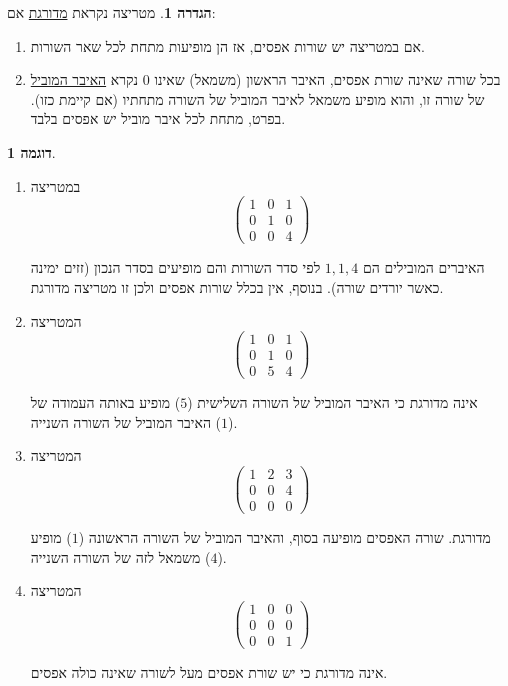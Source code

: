 \documentclass[12pt]{report}
\theoremstyle{plain}
\theoremstyle{definition}
\newtheorem{definition}[theorem]{הגדרה}
\newtheorem{example}{דוגמה}[chapter]
\newcommand{\0}{\mathbf{0}}
\begin{document}
\begin{definition}
מטריצה נקראת
\underline{מדורגת}
אם:

\begin{enumerate}[label=\alph*.]
\item
אם במטריצה יש שורות אפסים, אז הן מופיעות מתחת לכל
שאר השורות.

\item
בכל שורה שאינה שורת אפסים, האיבר הראשון (משמאל) שאינו $0$ נקרא
\underline{האיבר המוביל}
של שורה זו, והוא מופיע משמאל לאיבר המוביל של השורה מתחתיו (אם קיימת כזו). בפרט, מתחת לכל איבר מוביל יש אפסים בלבד.
\end{enumerate}
\end{definition}

\begin{example}\
\begin{enumerate}[label=\alph*.]
\item
במטריצה 
$$
\begin{pmatrix}1 & 0 & 1\\
0 & 1 & 0\\
0 & 0 & 4
\end{pmatrix}
$$

האיברים המובילים הם $1,1,4$ לפי סדר השורות והם מופיעים בסדר הנכון (זזים ימינה כאשר יורדים שורה). בנוסף, אין בכלל שורות אפסים ולכן זו
מטריצה מדורגת.

\item
המטריצה
$$
\begin{pmatrix}1 & 0 & 1\\
0 & 1 & 0\\
0 & 5 & 4
\end{pmatrix}
$$

אינה מדורגת כי האיבר המוביל של השורה השלישית ($5$) מופיע באותה
העמודה של האיבר המוביל של השורה השנייה ($1$).

\item
המטריצה 
$$
\begin{pmatrix}1 & 2 & 3\\
0 & 0 & 4\\
0 & 0 & 0
\end{pmatrix}
$$

מדורגת. שורה האפסים מופיעה בסוף, והאיבר המוביל של השורה הראשונה
($1$)
מופיע משמאל לזה של השורה השנייה
($4$).

\item
המטריצה 
$$
\begin{pmatrix}1 & 0 & 0\\
0 & 0 & 0\\
0 & 0 & 1
\end{pmatrix}
$$

אינה מדורגת כי יש שורת אפסים מעל לשורה שאינה כולה אפסים.

\end{enumerate}
\end{example}
\end{document}
